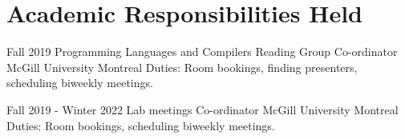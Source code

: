 
\section{Academic Responsibilities Held}

    \cventry
        {Fall 2019}
        {Programming Languages and Compilers Reading Group}
        {Co-ordinator}
        {McGill University}
        {Montreal}
        {Duties: Room bookings, finding presenters, scheduling biweekly meetings.}

    \cventry
        {Fall 2019 - Winter 2022}
        {Lab meetings}
        {Co-ordinator}
        {McGill University}
        {Montreal}
        {Duties: Room bookings, scheduling biweekly meetings.}
 
